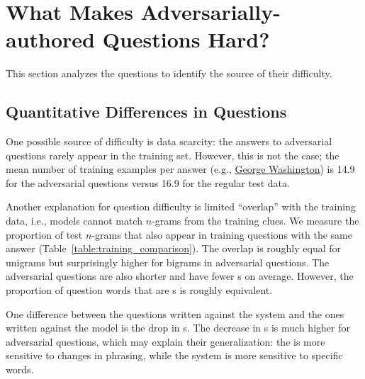 \section{What Makes Adversarially-authored Questions Hard?}
\label{sec:limitations}

This section analyzes the
\challenge{}
questions to identify the source of their difficulty.

\subsection{Quantitative Differences in Questions}

One possible source of difficulty 
is data scarcity: the answers to adversarial questions rarely
appear in the training set. However, this is not the case;
the mean number of training examples per answer (e.g., \underline{George Washington})
is 14.9 for the adversarial questions versus
16.9 for the regular test data.

Another explanation for question difficulty
is limited 
``overlap'' with the training data, i.e.,
models cannot match $n$-grams
from the training clues. We measure the proportion of test $n$-grams
that also appear in training questions with the same answer
(Table~\ref{table:training_comparison}).
The overlap is roughly equal for unigrams but surprisingly higher for 
bigrams in adversarial questions.
The adversarial questions are also shorter
and have fewer s on average.
However, the
proportion of question words that are s is
roughly equivalent. 

One difference between the questions written against
the  system and the ones written against the  model
is the drop in s. The decrease in s is much higher for  adversarial questions, which may explain their generalization: the 
is more sensitive to changes in phrasing, while the  system is more
sensitive to specific words.

